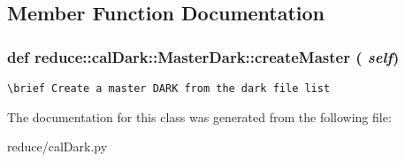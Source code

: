 \subsection{Member Function Documentation}
\subsubsection{\setlength{\rightskip}{0pt plus 5cm}def reduce::cal\-Dark::Master\-Dark::create\-Master ( {\em self})}\label{classreduce_1_1calDark_1_1MasterDark_4de6af2eeaadfc1a93a376f4e1731aac}




\footnotesize\begin{verbatim}
\brief Create a master DARK from the dark file list
\end{verbatim}
\normalsize
 

The documentation for this class was generated from the following file:\begin{CompactItemize}
\item 
reduce/cal\-Dark.py\end{CompactItemize}
